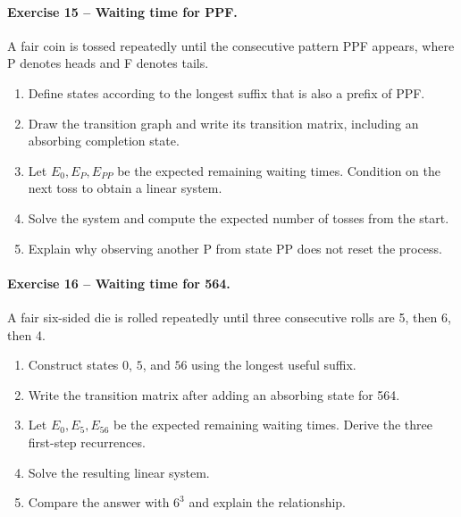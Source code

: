 \documentclass[10pt]{article}
\begin{document}
\paragraph{Exercise 15 -- Waiting time for PPF.}
A fair coin is tossed repeatedly until the consecutive pattern PPF appears,
where P denotes heads and F denotes tails.

\begin{enumerate}
\item Define states according to the longest suffix that is also a prefix of
PPF.
\item Draw the transition graph and write its transition matrix, including an
absorbing completion state.
\item Let $E_0,E_P,E_{PP}$ be the expected remaining waiting times. Condition
on the next toss to obtain a linear system.
\item Solve the system and compute the expected number of tosses from the
start.
\item Explain why observing another P from state PP does not reset the process.
\end{enumerate}

\paragraph{Exercise 16 -- Waiting time for 564.}
A fair six-sided die is rolled repeatedly until three consecutive rolls are
5, then 6, then 4.

\begin{enumerate}
\item Construct states $0$, $5$, and $56$ using the longest useful suffix.
\item Write the transition matrix after adding an absorbing state for 564.
\item Let $E_0,E_5,E_{56}$ be the expected remaining waiting times. Derive the
three first-step recurrences.
\item Solve the resulting linear system.
\item Compare the answer with $6^3$ and explain the relationship.
\end{enumerate}
\end{document}
